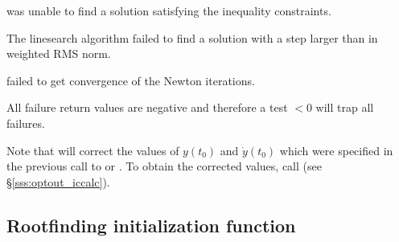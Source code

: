 {{\begin{args}
  \item[\Id{IDA\_CONSTR\_FAIL}]
     was unable to find a solution    
    satisfying the inequality constraints.     
                                                                 
  \item[\Id{IDA\_LINESEARCH\_FAIL}]
    The linesearch algorithm failed to find a solution with a step larger than 
     in weighted RMS norm.                      
                                                                 
  \item[\Id{IDA\_CONV\_FAIL}]
     failed to get convergence of the Newton iterations.

  \end{args} 
}
{
  All failure return values are negative and therefore a test  $< 0$
  will trap all  failures.

  Note that  will correct the values of $y(t_0)$ and $\dot{y}(t_0)$
  which were specified in the previous call to  or .
  To obtain the corrected values, call  (see \S\ref{sss:optout_iccalc}).
}


\subsection{Rootfinding initialization function}\label{ss:idarootinit}

}
